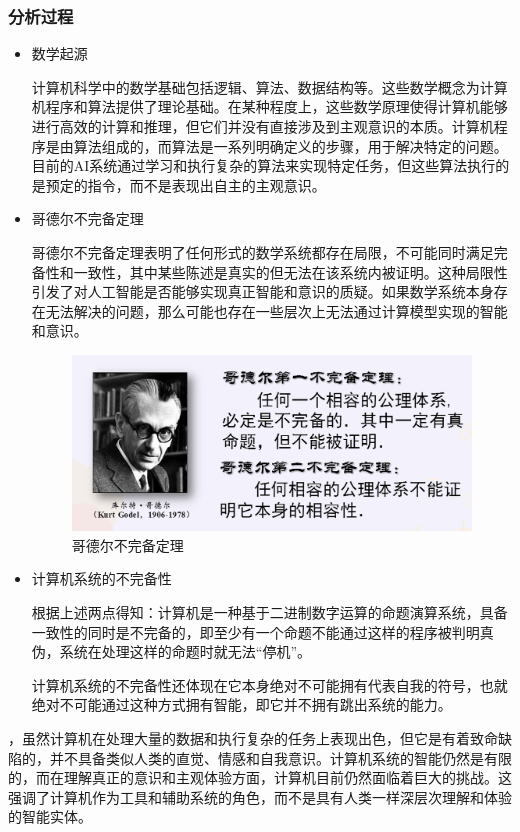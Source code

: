 \documentclass[square]{article}
\begin{document}
\subsubsection{分析过程}
\begin{itemize}
	\item 数学起源\par
	 计算机科学中的数学基础包括逻辑、算法、数据结构等。这些数学概念为计算机程序和算法提供了理论基础。在某种程度上，这些数学原理使得计算机能够进行高效的计算和推理，但它们并没有直接涉及到主观意识的本质。计算机程序是由算法组成的，而算法是一系列明确定义的步骤，用于解决特定的问题。目前的AI系统通过学习和执行复杂的算法来实现特定任务，但这些算法执行的是预定的指令，而不是表现出自主的主观意识。\par
	 \item 哥德尔不完备定理\cite{ref5}\par
	 哥德尔不完备定理表明了任何形式的数学系统都存在局限，不可能同时满足完备性和一致性，其中某些陈述是真实的但无法在该系统内被证明。这种局限性引发了对人工智能是否能够实现真正智能和意识的质疑。如果数学系统本身存在无法解决的问题，那么可能也存在一些层次上无法通过计算模型实现的智能和意识。\par
	 \begin{figure}[h!]
	 	\centering
	 	\includegraphics[width=12cm]{gedeer.jpeg}
	 	\caption{哥德尔不完备定理}
	 	\label{fig:gedeer}
	 \end{figure}
	 \item 计算机系统的不完备性\par
	 根据上述两点得知：计算机是一种基于二进制数字运算的命题演算系统，具备一致性的同时是不完备的，即至少有一个命题不能通过这样的程序被判明真伪，系统在处理这样的命题时就无法“停机”。\par
	 计算机系统的不完备性还体现在它本身绝对不可能拥有代表自我的符号，也就绝对不可能通过这种方式拥有智能，即它并不拥有跳出系统的能力。\par
\end{itemize}
，虽然计算机在处理大量的数据和执行复杂的任务上表现出色，但它是有着致命缺陷的，并不具备类似人类的直觉、情感和自我意识。计算机系统的智能仍然是有限的，而在理解真正的意识和主观体验方面，计算机目前仍然面临着巨大的挑战。这强调了计算机作为工具和辅助系统的角色，而不是具有人类一样深层次理解和体验的智能实体。\par
\end{document}
